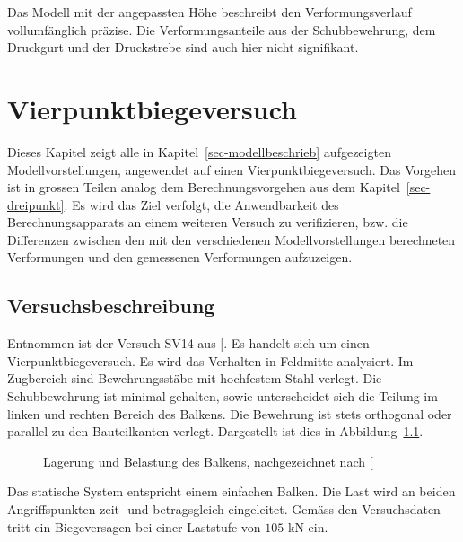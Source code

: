 \documentclass[
  12pt,
  letterpaper,
  egregdoesnotlikesansseriftitles]{scrreprt}
\begin{document}
Das Modell mit der angepassten Höhe beschreibt den Verformungsverlauf
vollumfänglich präzise. Die Verformungsanteile aus der Schubbewehrung,
dem Druckgurt und der Druckstrebe sind auch hier nicht signifikant.


\chapter{Vierpunktbiegeversuch}\label{sec-vierpunkt}

Dieses Kapitel zeigt alle in Kapitel~\ref{sec-modellbeschrieb}
aufgezeigten Modellvorstellungen, angewendet auf einen
Vierpunktbiegeversuch. Das Vorgehen ist in grossen Teilen analog dem
Berechnungsvorgehen aus dem Kapitel~\ref{sec-dreipunkt}. Es wird das
Ziel verfolgt, die Anwendbarkeit des Berechnungsapparats an einem
weiteren Versuch zu verifizieren, bzw. die Differenzen zwischen den mit
den verschiedenen Modellvorstellungen berechneten Verformungen und den
gemessenen Verformungen aufzuzeigen.

\section{Versuchsbeschreibung}\label{versuchsbeschreibung-1}

Entnommen ist der Versuch SV14 aus {[}\citeproc{ref-Tue2019}{2}{]}. Es
handelt sich um einen Vierpunktbiegeversuch. Es wird das Verhalten in
Feldmitte analysiert. Im Zugbereich sind Bewehrungsstäbe mit hochfestem
Stahl verlegt. Die Schubbewehrung ist minimal gehalten, sowie
unterscheidet sich die Teilung im linken und rechten Bereich des
Balkens. Die Bewehrung ist stets orthogonal oder parallel zu den
Bauteilkanten verlegt. Dargestellt ist dies in
Abbildung~\ref{fig-system_sv14}.

\begin{figure}[H]


\caption{\label{fig-system_sv14}Lagerung und Belastung des Balkens,
nachgezeichnet nach {[}\citeproc{ref-Tue2019}{2}{]}}

\end{figure}%

Das statische System entspricht einem einfachen Balken. Die Last wird an
beiden Angriffspunkten zeit- und betragsgleich eingeleitet. Gemäss den
Versuchsdaten tritt ein Biegeversagen bei einer Laststufe von
\(105 \text{ kN}\) ein.
\end{document}
